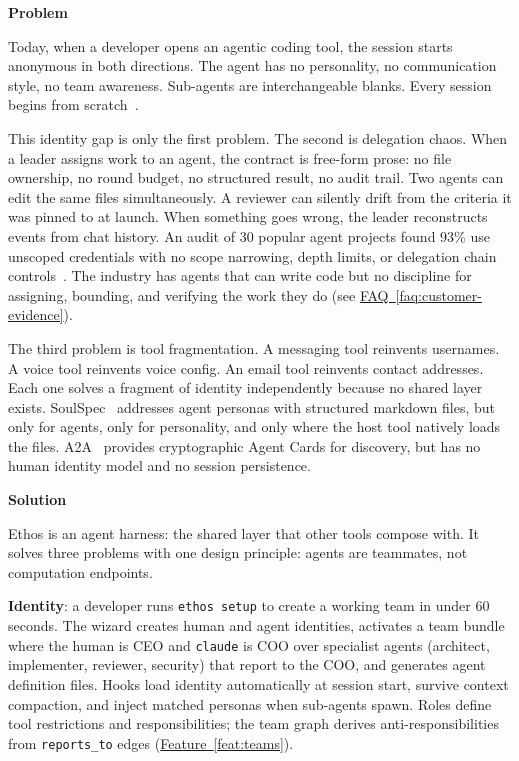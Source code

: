 \documentclass[11pt,letterpaper]{article}
\newcommand{\prsection}[1]{%
  \vspace{1em}%
  {\large\bfseries\color{SectionBlue}#1}%
  \vspace{0.3em}\par%
}
\newcommand{\faqref}[1]{\hyperref[#1]{FAQ~\ref*{#1}}}
\newcommand{\featureref}[1]{\hyperref[#1]{Feature~\ref*{#1}}}
\begin{document}
\prsection{Problem}

Today, when a developer opens an agentic coding tool, the session starts anonymous in both directions. The agent has no personality, no communication style, no team awareness. Sub-agents are interchangeable blanks. Every session begins from scratch~\cite{arxiv2025agenticmanifests,arxiv2025agentreadmes}.

This identity gap is only the first problem. The second is delegation chaos. When a leader assigns work to an agent, the contract is free-form prose: no file ownership, no round budget, no structured result, no audit trail. Two agents can edit the same files simultaneously. A reviewer can silently drift from the criteria it was pinned to at launch. When something goes wrong, the leader reconstructs events from chat history. An audit of 30 popular agent projects found 93\% use unscoped credentials with no scope narrowing, depth limits, or delegation chain controls~\cite{grantexagentsec2026}. The industry has agents that can write code but no discipline for assigning, bounding, and verifying the work they do (see \faqref{faq:customer-evidence}).

The third problem is tool fragmentation. A messaging tool reinvents usernames. A voice tool reinvents voice config. An email tool reinvents contact addresses. Each one solves a fragment of identity independently because no shared layer exists. SoulSpec~\cite{soulspec2026standard} addresses agent personas with structured markdown files, but only for agents, only for personality, and only where the host tool natively loads the files. A2A~\cite{a2av1milestone2026} provides cryptographic Agent Cards for discovery, but has no human identity model and no session persistence.

\prsection{Solution}

Ethos is an agent harness: the shared layer that other tools compose with. It solves three problems with one design principle: agents are teammates, not computation endpoints.

\textbf{Identity}: a developer runs {\small\texttt{ethos setup}} to create a working team in under 60 seconds. The wizard creates human and agent identities, activates a team bundle where the human is CEO and {\small\texttt{claude}} is COO over specialist agents (architect, implementer, reviewer, security) that report to the COO, and generates agent definition files. Hooks load identity automatically at session start, survive context compaction, and inject matched personas when sub-agents spawn. Roles define tool restrictions and responsibilities; the team graph derives anti-responsibilities from {\small\texttt{reports\_to}} edges (\featureref{feat:teams}).
\end{document}
